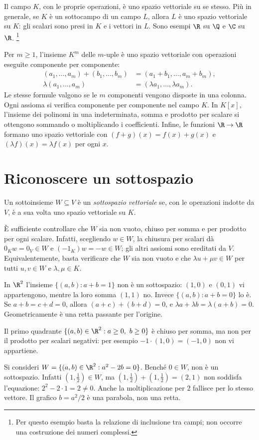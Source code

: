 Il campo $K$, con le proprie operazioni, è uno spazio vettoriale su se
stesso. Più in generale, se $K$ è un sottocampo di un campo $L$, allora
$L$ è uno spazio vettoriale su $K$: gli scalari sono presi in $K$ e i
vettori in $L$. Sono esempi $\R$ su $\Q$ e $\C$ su $\R$.
\footnote{Per questo esempio basta la relazione di inclusione tra campi;
non occorre una costruzione dei numeri complessi.}

Per $m\geq1$, l'insieme $K^m$ delle $m$-uple è uno spazio vettoriale con
operazioni eseguite componente per componente:
\begin{align*}
 (a_1,\ldots,a_m)+(b_1,\ldots,b_m)
   &=(a_1+b_1,\ldots,a_m+b_m),\\
 \lambda(a_1,\ldots,a_m)&=(\lambda a_1,\ldots,\lambda a_m).
\end{align*}
Le stesse formule valgono se le $m$ componenti vengono disposte in una
colonna. Ogni assioma si verifica componente per componente nel campo $K$.
In $K[x]$, l'insieme dei polinomi in una indeterminata, somma e prodotto
per scalare si ottengono sommando o moltiplicando i coefficienti. Infine,
le funzioni $\R\to\R$ formano uno spazio vettoriale con
$(f+g)(x)=f(x)+g(x)$ e $(\lambda f)(x)=\lambda f(x)$ per ogni $x$.

\section{Riconoscere un sottospazio}
\begin{definizione}
Un sottoinsieme $W\subseteq V$ è un \emph{sottospazio vettoriale} se, con
le operazioni indotte da $V$, è a sua volta uno spazio vettoriale su $K$.
\end{definizione}
È sufficiente controllare che $W$ sia non vuoto, chiuso per somma e per
prodotto per ogni scalare. Infatti, scegliendo $w\in W$, la chiusura per
scalari dà $0_Kw=0_V\in W$ e $(-1_K)w=-w\in W$; gli altri assiomi sono
ereditati da $V$. Equivalentemente, basta verificare che $W$ sia non
vuoto e che $\lambda u+\mu v\in W$ per tutti $u,v\in W$ e
$\lambda,\mu\in K$.

\begin{esempio}
In $\R^2$ l'insieme $\{(a,b):a+b=1\}$ non è un sottospazio:
$(1,0)$ e $(0,1)$ vi appartengono, mentre la loro somma $(1,1)$ no.
Invece $\{(a,b):a+b=0\}$ lo è. Se $a+b=c+d=0$, allora
$(a+c)+(b+d)=0$, e $\lambda a+\lambda b=\lambda(a+b)=0$.
Geometricamente è una retta passante per l'origine.
\end{esempio}
\begin{esempio}
Il primo quadrante $\{(a,b)\in\R^2:a\geq0,\ b\geq0\}$ è chiuso per
somma, ma non per il prodotto per scalari negativi: per esempio
$-1\cdot(1,0)=(-1,0)$ non vi appartiene.
\end{esempio}
\begin{esercizio}
Si consideri $W=\{(a,b)\in\R^2:a^2-2b=0\}$. Benché $0\in W$, non è
un sottospazio. Infatti $(1,\tfrac12)\in W$, ma
$(1,\tfrac12)+(1,\tfrac12)=(2,1)$ non soddisfa l'equazione:
$2^2-2\cdot1=2\ne0$. Anche la moltiplicazione per $2$ fallisce per lo
stesso vettore. Il grafico $b=a^2/2$ è una parabola, non una retta.
\end{esercizio}

